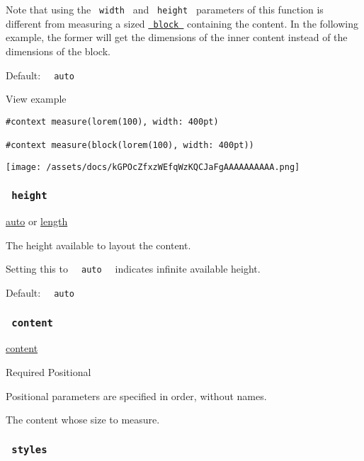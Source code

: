 Note that using the \texttt{\ width\ } and \texttt{\ height\ }
parameters of this function is different from measuring a sized
\href{/docs/reference/layout/block/}{\texttt{\ block\ }} containing the
content. In the following example, the former will get the dimensions of
the inner content instead of the dimensions of the block.

Default: \texttt{\ }{\texttt{\ auto\ }}\texttt{\ }


View example

\begin{verbatim}
#context measure(lorem(100), width: 400pt)

#context measure(block(lorem(100), width: 400pt))
\end{verbatim}

\texttt{[image: /assets/docs/kGPOcZfxzWEfqWzKQCJaFgAAAAAAAAAA.png]}

\subsubsection{\texorpdfstring{\texttt{\ height\ }}{ height }}\label{parameters-height}

\href{/docs/reference/foundations/auto/}{auto} {or}
\href{/docs/reference/layout/length/}{length}

The height available to layout the content.

Setting this to \texttt{\ }{\texttt{\ auto\ }}\texttt{\ } indicates
infinite available height.

Default: \texttt{\ }{\texttt{\ auto\ }}\texttt{\ }

\subsubsection{\texorpdfstring{\texttt{\ content\ }}{ content }}\label{parameters-content}

\href{/docs/reference/foundations/content/}{content}

{Required} {{ Positional }}

\label{parameters-content-positional-tooltip}
Positional parameters are specified in order, without names.

The content whose size to measure.

\subsubsection{\texorpdfstring{\texttt{\ styles\ }}{ styles }}\label{parameters-styles}

